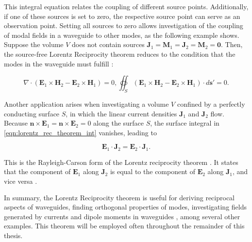 This integral equation relates the coupling of different source points. Additionally, if one of these sources is set to zero, the respective source point can serve as an observation point. Setting all sources to zero allows investigation of the coupling of modal fields in a waveguide to other modes, as the following example shows. Suppose the volume $V$ does not contain sources $\mathbf{J}_1 = \mathbf{M}_1 = \mathbf{J}_2 = \mathbf{M}_2 = \mathbf{0}$. Then, the source-free Lorentz Reciprocity theorem reduces to the condition that the modes in the waveguide must fulfill \cite[pp. 145-146]{Balanis_1997}: 

\begin{subequations}
	\begin{equation}
		\nabla \cdot (\mathbf{E}_1\times \mathbf{H}_2-\mathbf{E}_2\times \mathbf{H}_1)=0,
	\end{equation}
	\begin{equation}
		\oiint_S (\mathbf{E}_1\times \mathbf{H}_2-\mathbf{E}_2\times \mathbf{H}_1)\cdot d\mathbf{s}'=0.
		\label{eqn:modes_waveguide}
	\end{equation}
\end{subequations}

Another application arises when investigating a volume $V$ confined by a perfectly conducting surface $S$, in which the linear current densities $\mathbf{J}_1$ and $\mathbf{J}_2$ flow. Because $\mathbf{n}\times\mathbf{E}_1=\mathbf{n}\times\mathbf{E}_2=0$ along the surface $S$, the surface integral in \autoref{eqn:lorentz_rec_theorem_int} vanishes, leading to  

\begin{equation}
	\mathbf{E}_1\cdot\mathbf{J}_2=\mathbf{E}_2\cdot\mathbf{J}_1.
\end{equation}

This is the Rayleigh-Carson form of the Lorentz reciprocity theorem \cite[p. 50]{Collin_2015}. It states that the component of $\mathbf{E}_1$ along $\mathbf{J}_2$ is equal to the component of $\mathbf{E}_2$ along $\mathbf{J}_1$, and vice versa \cite[p. 50]{Collin_2015}. 

In summary, the Lorentz Reciprocity theorem is useful for deriving reciprocal aspects of waveguides, finding orthogonal properties of modes, investigating fields generated by currents and dipole moments in waveguides \cite[p. 50]{Collin_2015}, among several other examples. This theorem will be employed often throughout the remainder of this thesis.
